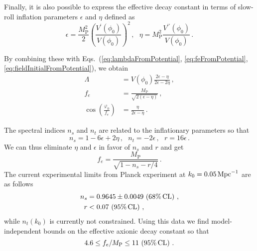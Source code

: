 \documentclass[12pt]{article}
\begin{document}
Finally, it is also possible to express the effective decay constant in terms of slow-roll inflation parameters $\epsilon$ and $\eta$ defined as
\begin{equation} \label{eq:epsEtaFromPotential}
  \epsilon =
    \frac{M_\text{P}^2}{2}
    \left(\frac{V^\prime\left(\phi_0\right)}{V\left(\phi_0\right)}\right)^2\,,
  ~~~ \eta = M_\text{P}^2 \frac{V^{\prime\prime}\left(\phi_0\right)}{V\left(\phi_0\right)}\,.
\end{equation}

By combining these with Eqs.~(\ref{eq:lambdaFromPotential}, \ref{eq:feFromPotential}, \ref{eq:fieldInitialFromPotential}), we obtain
\begin{align} %
  \label{eq:lambdaSlowRoll}
  \Lambda &= V\left(\phi_0\right) \frac{2 \epsilon - \eta}{2 \epsilon - 2 \eta}\,,\\
  \label{eq:feSlowRoll}
  f_e &= \frac{M_\text{P}}{\sqrt{2 \left(\epsilon - \eta\right)}}\,,\\
  \label{eq:fieldInitialSlowRoll}
  \cos\left(\frac{\varphi_0}{f_e}\right) &= \frac{\eta}{2 \epsilon - \eta}\,.
\end{align}

The spectral indices $n_s$ and $n_t$ are related to the inflationary parameters so that
\begin{equation} \label{eq:observablesSlowRoll}
  n_s = 1 - 6 \epsilon + 2 \eta\,,
  ~~~ n_t = -2 \epsilon\,,
  ~~~ r = 16 \epsilon\,.
\end{equation}
We can thus eliminate $\eta$ and $\epsilon$ in favor of $n_s$ and $r$ and get
\begin{equation}
  f_e = \frac{M_\text{P}}{\sqrt{1 - n_s - r / 4}}\,.
\end{equation}
The current experimental limits from Planck experiment at $k_0 = 0.05\,{\rm Mpc}^{-1}$ are as follows~\cite{Adam:2015rua, Ade:2015lrj, Array:2015xqh}
\begin{equation} \label{data}
  \begin{aligned}
    n_s &= 0.9645 \pm 0.0049\, \left(68\%\, {\rm CL}\right)\,,\\
      r &< 0.07\, \left(95\%\, {\rm CL}\right)\,,
  \end{aligned}
\end{equation}
while $n_t\left(k_0\right)$ is currently not constrained.
Using this data we find model-independent bounds on the effective axionic decay constant so that
\begin{equation} \label{eq:feExperimentalConstraint}
  4.6 \leq f_e / M_\text{P} \leq 11\, \left(95\%\, {\rm CL}\right)\,.
\end{equation}
\end{document}
